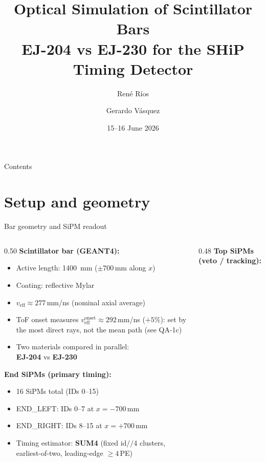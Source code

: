 \documentclass[aspectratio=169,9pt]{beamer}
\title[EJ-204 vs EJ-230 — SHiP Timing]{%
  Optical Simulation of Scintillator Bars\\
  \large EJ-204 vs EJ-230 for the SHiP Timing Detector}
\author[R.~Ríos / G.~Vásquez]{%
  René Ríos \and Gerardo Vásquez}
\institute[SHiP Timing]{SHiP Collaboration — Timing Detector Group}
\date{15--16 June 2026}
\begin{document}
\begin{frame}[plain]
  \titlepage
\end{frame}

\begin{frame}{Contents}
  \tableofcontents
\end{frame}

\section{Setup and geometry}

\begin{frame}{Bar geometry and SiPM readout}
  \begin{columns}[T]
    \begin{column}{0.50\textwidth}
      \textbf{Scintillator bar (GEANT4):}
      \begin{itemize}
        \item Active length: \SI{1400}{\mm} ($\pm700$\,mm along $x$)
        \item Coating: reflective Mylar
        \item $v_\text{eff}\approx277$\,mm/ns (nominal axial average)
        \item[$\hookrightarrow$] {\footnotesize ToF onset measures $v_\text{eff}^\text{onset}\approx292$\,mm/ns
              ($+5\%$): set by the most direct rays, not the mean path (see QA-1c)}
        \item Two materials compared in parallel:\\
              \textcolor{ej204col}{\textbf{EJ-204}} vs
              \textcolor{ej230col}{\textbf{EJ-230}}
      \end{itemize}
      \vspace{0.2em}
      \textbf{End SiPMs (primary timing):}
      \begin{itemize}
        \item 16 SiPMs total (IDs 0–15)
        \item END\_LEFT: IDs 0–7 at $x=-700$\,mm
        \item END\_RIGHT: IDs 8–15 at $x=+700$\,mm
        \item Timing estimator: \textbf{SUM4} (fixed id$/\!/$4 clusters, earliest-of-two, leading-edge $\geq4$\,PE)
      \end{itemize}
    \end{column}
    \begin{column}{0.48\textwidth}
      \textbf{Top SiPMs (veto / tracking):}

\end{column}
\end{columns}
\end{frame}
\end{document}
